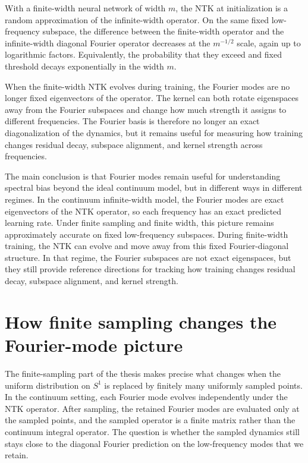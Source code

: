 With a finite-width neural network of width \(m\), the NTK at initialization is a random approximation
of the infinite-width operator. On the same fixed low-frequency subspace, the
difference between the finite-width operator and the infinite-width diagonal
Fourier operator decreases at the \(m^{-1/2}\) scale, again up to logarithmic
factors. Equivalently, the probability that they exceed and fixed threshold decays
exponentially in the width \(m\).

When the finite-width NTK evolves during training, the Fourier modes are no
longer fixed eigenvectors of the operator. The kernel can both rotate
eigenspaces away from the Fourier subspaces and change how much strength it
assigns to different frequencies. The Fourier basis is therefore no longer an
exact diagonalization of the dynamics, but it remains useful for measuring how
training changes residual decay, subspace alignment, and kernel strength across
frequencies.

The main conclusion is that Fourier modes remain useful for understanding
spectral bias beyond the ideal continuum model, but in different ways in
different regimes. In the continuum infinite-width model, the Fourier modes are
exact eigenvectors of the NTK operator, so each frequency has an exact predicted
learning rate. Under finite sampling and finite width, this picture
remains approximately accurate on fixed low-frequency subspaces. During
finite-width training, the NTK can evolve and move away from this fixed
Fourier-diagonal structure. In that regime, the Fourier subspaces are not exact
eigenspaces, but they still provide reference directions for tracking how
training changes residual decay, subspace alignment, and kernel strength.

\section{How finite sampling changes the Fourier-mode picture}
\label{sec:discussion-finite-data}

The finite-sampling part of the thesis makes precise what changes when the
uniform distribution on \(S^1\) is replaced by finitely many uniformly sampled
points. In the continuum setting, each Fourier mode evolves independently under
the NTK operator. After sampling, the retained Fourier modes are evaluated only
at the sampled points, and the sampled operator is a finite matrix rather than
the continuum integral operator. The question is whether the sampled dynamics
still stays close to the diagonal Fourier prediction on the low-frequency modes
that we retain.

